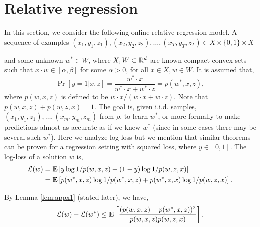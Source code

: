 \documentclass{article}
\begin{document}




\vskip 0.3in


\section{Relative regression}

In this section, we consider the following online relative regression model.  A sequence of examples $(x_1,y_1,z_1),(x_2,y_2,z_2),\ldots,(x_T,y_T,z_T) \in X \times \{0,1\} \times X$


and some unknown $w^* \in W$, where $X,W \subset \mathbb{R}^d$ are known compact convex sets such that $x \cdot w \in [\alpha,\beta]$ for some $\alpha>0$, for all $x\in X, w \in W$.  It is assumed that,
$$
\Pr[y=1|x,z] = \frac{w^* \cdot x}{w^* \cdot x + w^* \cdot z}=p(w^*,x,z),$$
where $p(w,x,z)$ is defined to be $w\cdot x/(w \cdot x+w\cdot z)$.  Note that $p(w,x,z)+p(w,z,x)=1$.  The goal is, given i.i.d. samples, $(x_1,y_1,z_1),\ldots,(x_m,y_m,z_m)$ from $\rho$, to learn $w^*$, or more formally to make predictions almost as accurate as if we knew $w^*$ (since in some cases there may be several such $w^*$).  Here we analyze log-loss but we mention that similar theorems can be proven for a regression setting with squared loss, where  $y \in [0,1]$.
The log-loss of a solution $w$ is,
\begin{align*}
\mathcal{L}(w) &= {\bf E}\left[ y \log 1/p(w,x,z) + (1-y)  \log 1/p(w,z,x)\right] \\
&=
{\bf E}\left[ p(w^*,x,z) \log 1/p(w^*,x,z) + p(w^*,z,x) \log 1/p(w,z,x)\right].
\end{align*}

By Lemma \ref{lem:appx1} (stated later), we have,
$$\mathcal{L}(w) -\mathcal{L}(w^*) \leq {\bf E}\left[\frac{(p(w,x,z)-p(w^*,x,z))^2}{p(w,x,z)p(w,z,x)}\right].$$
\end{document}
